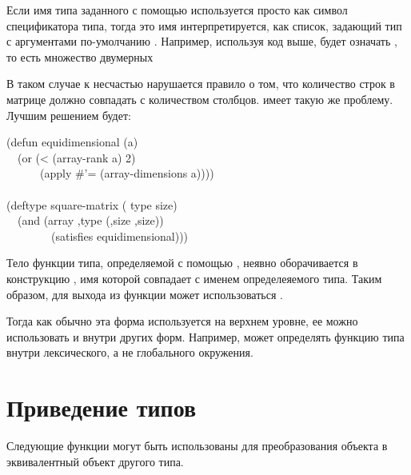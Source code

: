 \begin{defmac}
Если имя типа заданного с помощью  используется просто как символ
спецификатора типа, тогда это имя интерпретируется, как список, задающий тип с
аргументами по-умолчанию \cd{*}. Например, используя код выше,
 будет означать , то есть множество двумерных

В таком случае к несчастью нарушается правило о том, что количество строк в
матрице должно совпадать с количеством столбцов.  имеет
такую же проблему.
Лучшим решением будет:
\begin{lisp}
(defun equidimensional (a) \\
~~(or (< (array-rank a) 2) \\
~~~~~~(apply \#'= (array-dimensions a)))) \\
 \\
(deftype square-matrix ( type size) \\
~~{\Xbq}(and (array ,type (,size ,size)) \\
~~~~~~~~(satisfies equidimensional)))
\end{lisp}

Тело функции типа, определяемой с помощью , неявно оборачивается в
конструкцию , имя которой совпадает с именем определеяемого типа.
Таким образом, для выхода из функции может использоваться .

Тогда как обычно эта форма используется на верхнем уровне, ее можно
использовать и внутри других форм.
Например,  может определять функцию типа внутри лексического, а не
глобального окружения.
\end{defmac}

\section{Приведение типов}

Следующие функции могут быть использованы для преобразования объекта в
эквивалентный объект другого типа.

